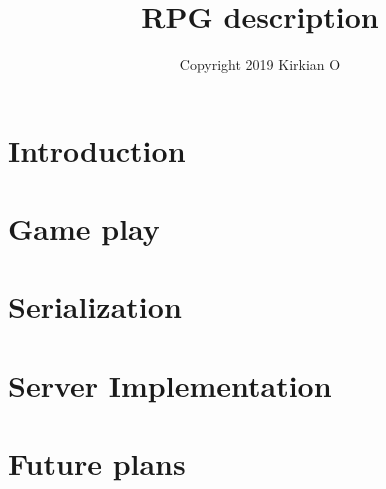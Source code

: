 \documentclass[12pt,fleqn]{article}
\title{RPG description}
\author{Copyright 2019 Kirkian O}
\begin{document}
\maketitle

\tableofcontents



\section{Introduction}
\label{sec:intro}


\section{Game play}
\label{sec:play}


\section{Serialization}
\label{sec:serialization}


\section{Server Implementation}
\label{sec:server-impl}


\section{Future plans}
\label{sec:future}

\end{document}

